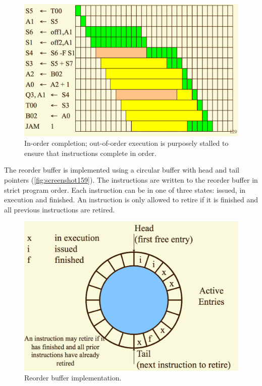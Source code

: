 \begin{figure}
\centering
\includegraphics[width=0.7\linewidth]{screenshot158}
\caption[In-order completion.]{In-order completion; out-of-order execution is purposely stalled to ensure that instructions complete in order.}
\label{fig:screenshot158}
\end{figure}

The reorder buffer is implemented using a circular buffer with head and tail pointers (\autoref{fig:screenshot159}). The instructions are written to the reorder buffer in strict program order. Each instruction can be in one of three states: issued, in execution and finished. An instruction is only allowed to retire if it is finished and all previous instructions are retired.

\begin{figure}
\centering
\includegraphics[width=0.7\linewidth]{screenshot159}
\caption{Reorder buffer implementation.}
\label{fig:screenshot159}
\end{figure}


